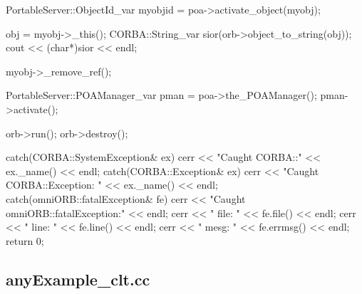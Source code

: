 \documentclass[11pt,twoside,a4paper]{book}
\begin{document}
\begin{cxxlisting}
{{    PortableServer::ObjectId_var myobjid = poa->activate_object(myobj);

    obj = myobj->_this();
    CORBA::String_var sior(orb->object_to_string(obj));
    cout << (char*)sior << endl;

    myobj->_remove_ref();

    PortableServer::POAManager_var pman = poa->the_POAManager();
    pman->activate();

    orb->run();
    orb->destroy();
  }
  catch(CORBA::SystemException& ex) {
    cerr << "Caught CORBA::" << ex._name() << endl;
  }
  catch(CORBA::Exception& ex) {
    cerr << "Caught CORBA::Exception: " << ex._name() << endl;
  }
  catch(omniORB::fatalException& fe) {
    cerr << "Caught omniORB::fatalException:" << endl;
    cerr << "  file: " << fe.file() << endl;
    cerr << "  line: " << fe.line() << endl;
    cerr << "  mesg: " << fe.errmsg() << endl;
  }
  return 0;
}
\end{cxxlisting}


\clearpage

\subsection{anyExample\_clt.cc}
\end{document}
